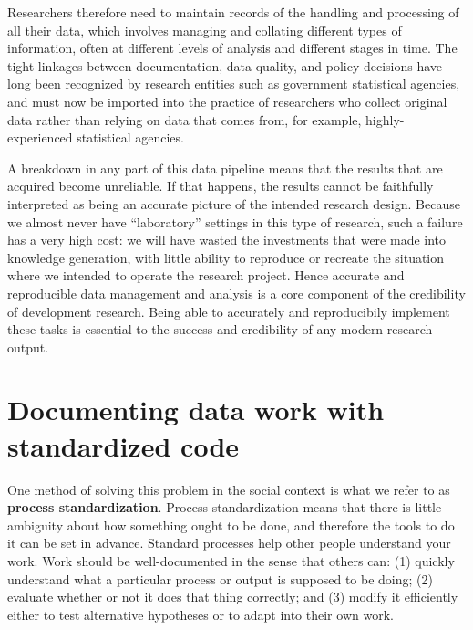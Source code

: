 Researchers therefore need to maintain records of the handling and processing of all their data,
which involves managing and collating different types of information,
often at different levels of analysis and different stages in time.
The tight linkages between documentation, data quality, and policy decisions
have long been recognized by research entities such as government statistical agencies,\cite{jepdataquality}
and must now be imported into the practice of researchers who collect original data
rather than relying on data that comes from, for example, highly-experienced statistical agencies.

A breakdown in any part of this data pipeline
means that the results that are acquired become unreliable.\cite{mccullough2008economics}
If that happens, the results cannot be faithfully interpreted
as being an accurate picture of the intended research design.
Because we almost never have ``laboratory'' settings in this type of research,
such a failure has a very high cost:
we will have wasted the investments that were made into knowledge generation,
with little ability to reproduce or recreate the situation
where we intended to operate the research project.\cite{camerer2016evaluating}
Hence accurate and reproducible data management and analysis is a core component
of the credibility of development research.
Being able to accurately and reproducibily implement these tasks
is essential to the success and credibility of any modern research output.


\section{Documenting data work with standardized code}

One method of solving this problem in the social context
is what we refer to as \textbf{process standardization}.
Process standardization means that there is
little ambiguity about how something ought to be done,
and therefore the tools to do it can be set in advance.
Standard processes help other people understand your work.
Work should be well-documented in the sense that others can:
(1) quickly understand what a particular process or output is supposed to be doing;
(2) evaluate whether or not it does that thing correctly; and
(3) modify it efficiently either to test alternative hypotheses
or to adapt into their own work.

